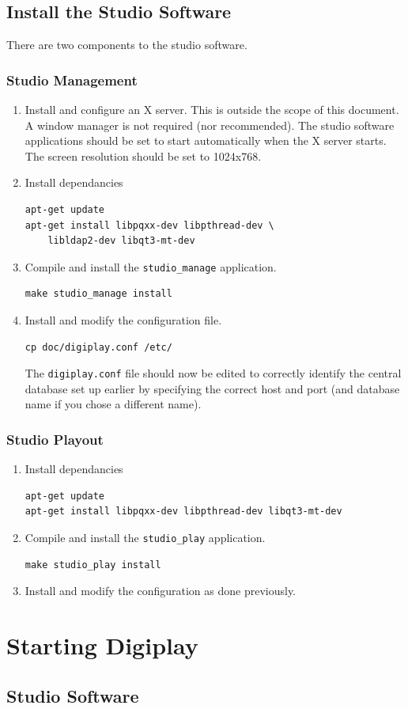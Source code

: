 \documentclass[a4paper,12pt]{report}
\numberwithin{equation}{section}
\begin{document}
\section{Install the Studio Software}
There are two components to the studio software. 
\subsection{Studio Management}
\begin{enumerate}
\item Install and configure an X server. This is outside the scope of this document. A window manager is not required (nor recommended). The studio software applications should be set to start automatically when the X server starts. The screen resolution should be set to 1024x768.
\item Install dependancies
\begin{lstlisting}
apt-get update
apt-get install libpqxx-dev libpthread-dev \
	libldap2-dev libqt3-mt-dev
\end{lstlisting}
\item Compile and install the \texttt{studio\_manage} application.
\begin{lstlisting}
make studio_manage install
\end{lstlisting}
\item Install and modify the configuration file.
\begin{lstlisting}
cp doc/digiplay.conf /etc/
\end{lstlisting}
The \texttt{digiplay.conf} file should now be edited to correctly identify the central database set up earlier by specifying the correct host and port (and database name if you chose a different name).
\end{enumerate}
\subsection{Studio Playout}
\begin{enumerate}
\item Install dependancies
\begin{lstlisting}
apt-get update
apt-get install libpqxx-dev libpthread-dev libqt3-mt-dev
\end{lstlisting}
\item Compile and install the \texttt{studio\_play} application.
\begin{lstlisting}
make studio_play install
\end{lstlisting}
\item Install and modify the configuration as done previously.
\end{enumerate}

\chapter{Starting Digiplay}
\section{Studio Software}
\end{document}
